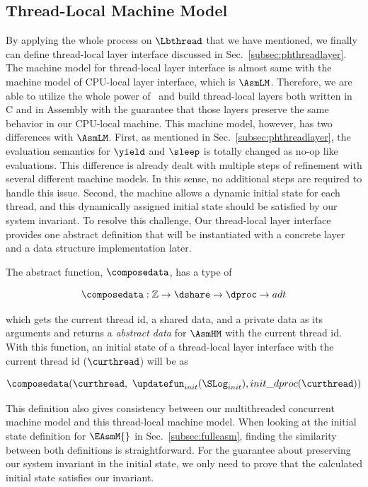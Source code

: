\subsection{Thread-Local Machine Model}\label{subsec:hasm}
By applying the whole process on $\Lbthread$ that we have mentioned,
we finally can define thread-local layer interface  discussed in Sec.~\ref{subsec:phthreadlayer}.
The machine model for thread-local layer interface is almost same with the machine model of CPU-local layer interface, which is $\AsmLM$.
Therefore, we are able to 
utilize the whole power of \compcertx\ and build thread-local layers both written in C and in Assembly with the guarantee that those layers preserve the same behavior in our CPU-local machine.
This machine model, however, has two differences with  $\AsmLM$.
First, as mentioned in Sec.~\ref{subsec:phthreadlayer}, the evaluation semantics
for $\yield$ and $\sleep$ is totally changed as no-op like evaluations.
This difference is already dealt with multiple steps of refinement with several different machine models. 
In this sense, no additional steps are required to handle this issue.
Second, the machine allows a dynamic initial state for each thread, and this dynamically assigned 
initial state should be satisfied by our system invariant.
To resolve this challenge, 
Our thread-local layer interface provides one abstract definition that will be
instantiated with a concrete layer and a data structure implementation later.

The abstract function, $\composedata$, has a type of
\begin{small}
\[
\composedata : \mathbb{Z} \rightarrow \dshare \rightarrow \dproc \rightarrow adt
\]
\end{small}
which gets the current thread id, a shared data, and a private data as its arguments 
and returns a \textit{abstract data} for $\AsmHM$ with the current thread id.
With this function, an initial state of a thread-local layer interface with the current thread id ($\curthread$) will be 
as
\begin{small}
\[
\composedata(\curthread, \ \updatefun_{init}(\SLog_{init}), init\_dproc(\curthread))
\]
\end{small}
This definition also gives consistency between our multithreaded concurrent machine model 
and this thread-local machine model.
When looking at the initial state definition for $\EAsmM{}$ in Sec.~\ref{subsec:fulleasm},
finding the similarity between both definitions is straightforward.
For the guarantee about preserving our system invariant in the initial state, we only need to prove that 
the calculated initial state satisfies our invariant.

